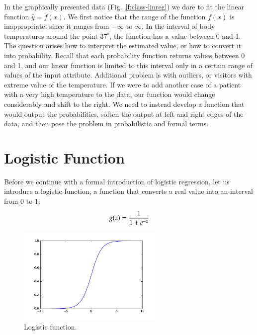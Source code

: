 \begin{refsection}
In the graphically presented data (Fig.~\ref{f:class-linreg}) we dare to fit the linear function $\hat{y}=f(x)$. We first notice that the range of the function $f(x)$ is inappropriate, since it ranges from $-\infty$ to $\infty$. In the interval of body temperatures around the point $37^{\circ}$, the function has a value between 0 and 1. The question arises how to interpret the estimated value, or how to convert it into probability. Recall that each probability function returns values between 0 and 1, and our linear function is limited to this interval only in a certain range of values of the input attribute. Additional problem is with outliers, or visitors with extreme value of the temperature. If we were to add another case of a patient with a very high temperature to the data, our function would change considerably and shift to the right. We need to instead develop a function that would output the probabilities, soften the output at left and right edges of the data, and then pose the problem in probabilistic and formal terms.

\section{Logistic Function}

Before we continue with a formal introduction of logistic regression, let us introduce a logistic function, a function that converts a real value into an interval from 0 to 1:
\begin{equation}
  g(z) = {1\over 1+e^{-z}}
\end{equation}

\begin{figure}[htbp]
\begin{center}
\includegraphics[width=7cm]{figures/logistic.pdf}
\caption{Logistic function.}
\label{f:logistic-function}
\end{center}
\end{figure}


\end{refsection}
